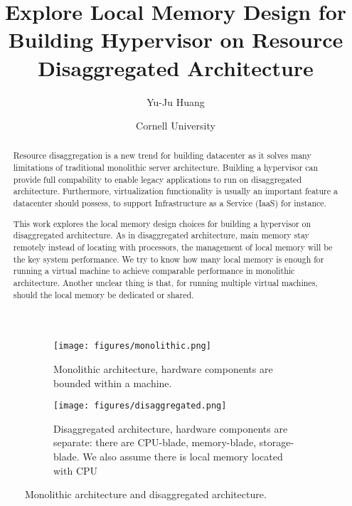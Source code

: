 \documentclass[twocolumn]{article}
\title{Explore Local Memory Design for Building Hypervisor on Resource Disaggregated Architecture}
\author{Yu-Ju Huang}
\date{Cornell University}
\begin{document}
\maketitle

\begin{abstract}
Resource disaggregation is a new trend for building datacenter as it solves many limitations of traditional monolithic server architecture. Building a hypervisor can provide full compability to enable legacy applications to run on disaggregated architecture. Furthermore, virtualization functionality is usually an important feature a datacenter should possess, to support Infrastructure as a Service (IaaS) for instance.

This work explores the local memory design choices for building a hypervisor on disaggregated architecture. As in disaggregated architecture, main memory stay remotely instead of locating with processors, the management of local memory will be the key system performance. We try to know how many local memory is enough for running a virtual machine to achieve comparable performance in monolithic architecture. Another unclear thing is that, for running multiple virtual machines, should the local memory be dedicated or shared.

\end{abstract}

\iffalse
\begin{figure*}[h!]
  \subcaptionbox{Monolithic architecture, hardware components are bounded within a machine.\label{fig:monolithic}}[.3\textwidth]{\texttt{[image: figures/monolithic.png]}}
  \subcaptionbox{Disaggregated architecture, hardware components are separate: there are CPU-blade, memory-blade, storage-blade. We also assume there is local memory located with CPU.\label{fig:disaggregated}}[.7\textwidth]{\texttt{[image: figures/disaggregated.png]}}
  \caption{Monolithic architecture and disaggregated architecture.}
  \label{fig:architecture}
\end{figure*}
\fi

\begin{figure*}[h!]
     \centering
     \captionsetup[subfigure]{position=b}
     \begin{subfigure}[b]{0.28\textwidth}
         \texttt{[image: figures/monolithic.png]}
         \caption{Monolithic architecture, hardware components are bounded within a machine.}
         \label{fig:monolithic architecture}
     \end{subfigure}
     \hfill
     \begin{subfigure}[b]{0.68\textwidth}
         \texttt{[image: figures/disaggregated.png]}
         \caption{Disaggregated architecture, hardware components are separate: there are CPU-blade, memory-blade, storage-blade. We also assume there is local memory located with CPU}
         \label{fig:disaggregated architecture}
     \end{subfigure}
     \caption{Monolithic architecture and disaggregated architecture.}
     \label{fig:architecture}
\end{figure*}
\end{document}
